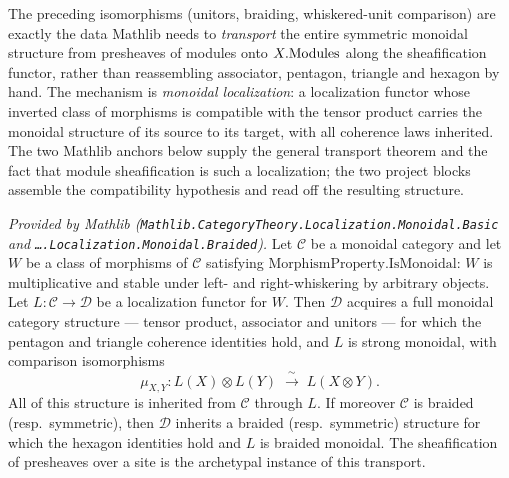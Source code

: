 The preceding isomorphisms (unitors, braiding, whiskered-unit comparison) are
exactly the data Mathlib needs to \emph{transport} the entire symmetric monoidal
structure from presheaves of modules onto \(X.\mathrm{Modules}\) along the sheafification
functor, rather than reassembling associator, pentagon, triangle and hexagon by
hand. The mechanism is \emph{monoidal localization}: a localization functor whose
inverted class of morphisms is compatible with the tensor product carries the
monoidal structure of its source to its target, with all coherence laws inherited.
The two Mathlib anchors below supply the general transport theorem and the fact
that module sheafification is such a localization; the two project blocks assemble
the compatibility hypothesis and read off the resulting structure.

\begin{lemma}
  \label{lem:monoidalLocalization_mathlib}
  \mathlibok
  \textit{Provided by Mathlib
  (\texttt{Mathlib.CategoryTheory.Localization.Monoidal.Basic} and
  \texttt{\ldots.Localization.Monoidal.Braided}).}
  Let \(\mathcal{C}\) be a monoidal category and let \(W\) be a class of morphisms
  of \(\mathcal{C}\) satisfying \(\mathrm{MorphismProperty.IsMonoidal}\): \(W\) is
  multiplicative and stable under left- and right-whiskering by arbitrary objects.
  Let \(L : \mathcal{C} \to \mathcal{D}\) be a
  localization functor for \(W\). Then \(\mathcal{D}\) acquires a full monoidal
  category structure --- tensor product, associator and unitors --- for which the
  pentagon and triangle coherence identities hold, and \(L\) is strong monoidal,
  with comparison isomorphisms
  \[
    \mu_{X,Y} : L(X) \otimes L(Y) \;\xrightarrow{\ \sim\ }\; L(X \otimes Y).
  \]
  All of this structure is inherited from \(\mathcal{C}\) through \(L\). If moreover
  \(\mathcal{C}\) is braided (resp.\ symmetric), then \(\mathcal{D}\) inherits a
  braided (resp.\ symmetric) structure for which the hexagon identities hold and
  \(L\) is braided monoidal. The sheafification of presheaves over a site is the
  archetypal instance of this transport.
\end{lemma}

